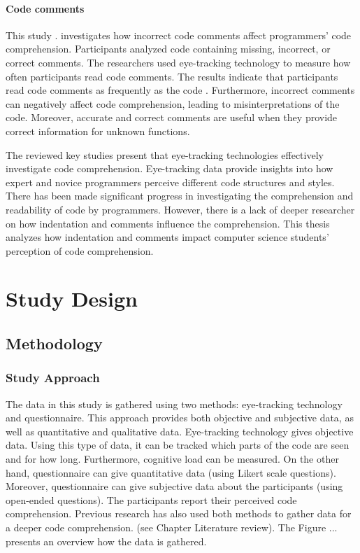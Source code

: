 \subsubsection{Code comments} 

This study \citet{bakhuizen2019comments}. investigates how incorrect code comments affect programmers' code comprehension. Participants analyzed code containing missing, incorrect, or correct comments.
The researchers used eye-tracking technology to measure how often participants read code comments. The results indicate that participants read code comments as frequently as the code \citet{bakhuizen2019comments}. Furthermore, incorrect comments can negatively affect code comprehension, leading to misinterpretations of the code. Moreover, accurate and correct comments are useful when they provide correct information for unknown functions. 

The reviewed key studies present that eye-tracking technologies effectively investigate code comprehension.  Eye-tracking data provide insights into how expert and novice programmers perceive different code structures and styles. There has been made significant progress in investigating the comprehension and readability of code by programmers.  However, there is a lack of deeper researcher on how indentation and comments influence the comprehension. 
This thesis analyzes how indentation and comments impact computer science students’ perception of code comprehension.  





\chapter{Study Design}



\section{Methodology}

\subsection{Study Approach}

The data in this study is gathered using two methods: eye-tracking technology and questionnaire. This approach provides both objective and subjective data, as well as quantitative and qualitative data.
Eye-tracking technology gives objective data. Using this type of data, it can be tracked which parts of the code are seen and for how long. Furthermore, cognitive load can be measured.
On the other hand, questionnaire can give quantitative data (using Likert scale questions). Moreover, questionnaire can give subjective data about the participants (using open-ended questions). The participants report their perceived code comprehension.  
Previous research has also used both methods to gather data for a deeper code comprehension. (see Chapter Literature review). The Figure ... presents an overview how the data is gathered. 



